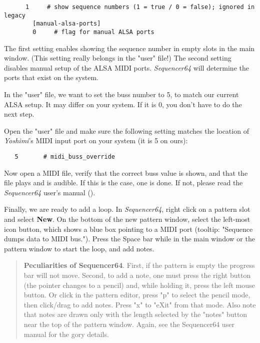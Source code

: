    \begin{verbatim}
      1     # show sequence numbers (1 = true / 0 = false); ignored in legacy
		[manual-alsa-ports]
		0     # flag for manual ALSA ports
   \end{verbatim}

   The first setting enables showing the sequence number in empty slots in the
   main window.  (This setting really belongs in the "user" file!)
   The second setting disables manual setup of the ALSA MIDI ports.
   \textsl{Sequencer64} will determine the ports that exist on the system.

   In the "user" file, we want to set the buss number to 5, to match our
   current ALSA setup.  It may differ on your system.  If it is 0, you don't
   have to do the next step.

   Open the "user" file and make sure the following setting matches the
   location of \textsl{Yoshimi}'s MIDI input port on your system (it is 5 on
   ours):

   \begin{verbatim}
   5       # midi_buss_override
   \end{verbatim}

   Now open a MIDI file, verify that the correct buss value is shown, and that
   the file plays and is audible.  If this is the case, one is done.  If not,
   please read the \textsl{Sequencer64} user's manual
   (\cite{sequencer64doc}).

   Finally, we are ready to add a loop.  In \textsl{Sequencer64}, right click
   on a pattern slot and select \textbf{New}.  On the bottom of the new pattern
   window, select the left-most icon button, which shows a blue box pointing to
   a MIDI port (tooltip: "Sequence dumps data to MIDI bus.").
   Press the Space bar while in the main window or the pattern window
   to start the loop, and add notes.

   \begin{quotation}
      \textbf{Peculiarities of Sequencer64}.
      First, if the pattern is empty the
      progress bar will not move.  Second, to add a note, one must press
      the right button (the pointer changes to a pencil) and, while holding
      it, press the left mouse button.  Or click in the pattern editor, press
      "p" to select the pencil mode, then click/drag to add notes.  Press "x"
      to "eXit" from that mode.  Also note that notes are drawn only with the
      length selected by the "notes" button near the top of the pattern window.
      Again, see the Sequencer64 user manual for the gory details.
   \end{quotation}

